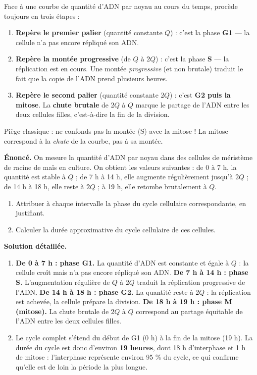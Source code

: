 \documentclass[11pt]{article}
\begin{document}
\begin{methode}
Face à une courbe de quantité d'ADN par noyau au cours du temps, procède toujours en trois étapes :
\begin{enumerate}
\item \textbf{Repère le premier palier} (quantité constante $Q$) : c'est la phase \textbf{G1} — la cellule n'a pas encore répliqué son ADN.
\item \textbf{Repère la montée progressive} (de $Q$ à $2Q$) : c'est la phase \textbf{S} — la réplication est en cours. Une montée \emph{progressive} (et non brutale) traduit le fait que la copie de l'ADN prend plusieurs heures.
\item \textbf{Repère le second palier} (quantité constante $2Q$) : c'est \textbf{G2 puis la mitose}. La \textbf{chute brutale} de $2Q$ à $Q$ marque le partage de l'ADN entre les deux cellules filles, c'est-à-dire la fin de la division.
\end{enumerate}
Piège classique : ne confonds pas la montée (S) avec la mitose ! La mitose correspond à la \emph{chute} de la courbe, pas à sa montée.
\end{methode}

\begin{exoresolu}
\textbf{Énoncé.} On mesure la quantité d'ADN par noyau dans des cellules de méristème de racine de maïs en culture. On obtient les valeurs suivantes : de 0 à 7 h, la quantité est stable à $Q$ ; de 7 h à 14 h, elle augmente régulièrement jusqu'à $2Q$ ; de 14 h à 18 h, elle reste à $2Q$ ; à 19 h, elle retombe brutalement à $Q$.
\begin{enumerate}
\item Attribuer à chaque intervalle la phase du cycle cellulaire correspondante, en justifiant.
\item Calculer la durée approximative du cycle cellulaire de ces cellules.
\end{enumerate}
\tcblower
\textbf{Solution détaillée.}
\begin{enumerate}
\item \textbf{De 0 à 7 h : phase G1.} La quantité d'ADN est constante et égale à $Q$ : la cellule croît mais n'a pas encore répliqué son ADN. \textbf{De 7 h à 14 h : phase S.} L'augmentation régulière de $Q$ à $2Q$ traduit la réplication progressive de l'ADN. \textbf{De 14 h à 18 h : phase G2.} La quantité reste à $2Q$ : la réplication est achevée, la cellule prépare la division. \textbf{De 18 h à 19 h : phase M (mitose).} La chute brutale de $2Q$ à $Q$ correspond au partage équitable de l'ADN entre les deux cellules filles.
\item Le cycle complet s'étend du début de G1 (0 h) à la fin de la mitose (19 h). La durée du cycle est donc d'environ \textbf{19 heures}, dont 18 h d'interphase et 1 h de mitose : l'interphase représente environ 95 \% du cycle, ce qui confirme qu'elle est de loin la période la plus longue.
\end{enumerate}
\end{exoresolu}
\end{document}
